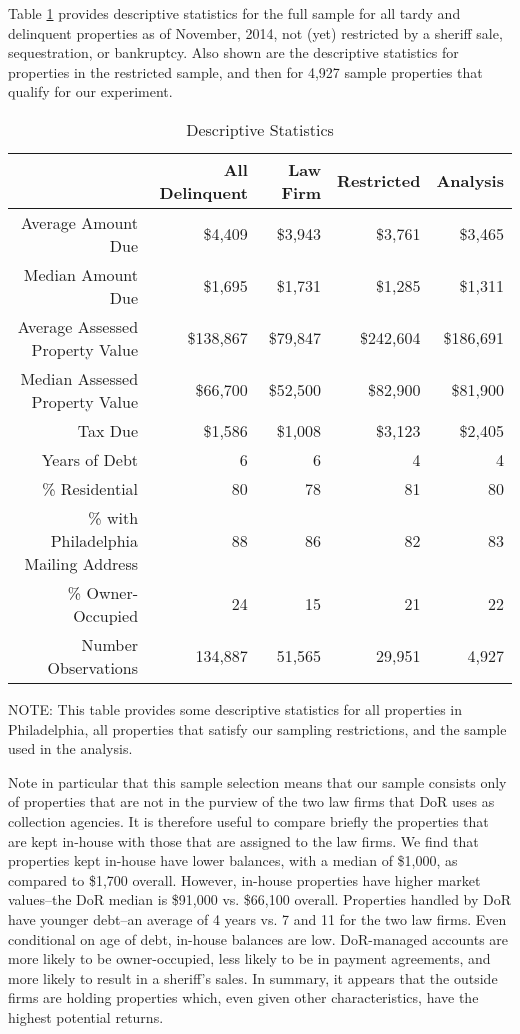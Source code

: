 \documentclass[12pt,titlepage]{article}
\begin{document}
Table \ref{table:descriptives} provides descriptive statistics for the full sample 
for all tardy and delinquent properties as of November, 2014, not (yet) 
restricted by a sheriff sale, sequestration, or bankruptcy.   Also shown 
are the descriptive statistics for properties in the restricted sample, 
and then for  4,927 sample properties that qualify for our experiment.


\begin{table}[ht]
\centering
\caption{Descriptive Statistics} 
\label{table:descriptives}
\begin{tabular}{|r|r|r|r|r|}
  \hline
 & All Delinquent & Law Firm & Restricted & Analysis \\ 
  \hline
Average Amount Due & \$4,409 & \$3,943 & \$3,761 & \$3,465 \\ 
  Median Amount Due & \$1,695 & \$1,731 & \$1,285 & \$1,311 \\ 
  Average Assessed Property Value & \$138,867 & \$79,847 & \$242,604 & \$186,691 \\ 
  Median Assessed Property Value & \$66,700 & \$52,500 & \$82,900 & \$81,900 \\ 
  Tax Due & \$1,586 & \$1,008 & \$3,123 & \$2,405 \\ 
  Years of Debt & 6 & 6 & 4 & 4 \\ 
  \% Residential & 80 & 78 & 81 & 80 \\ 
  \% with Philadelphia Mailing Address & 88 & 86 & 82 & 83 \\ 
  \% Owner-Occupied & 24 & 15 & 21 & 22 \\ 
  Number Observations & 134,887 & 51,565 & 29,951 & 4,927 \\ 
   \hline
\end{tabular}
NOTE: This table provides some descriptive statistics for all
properties in Philadelphia, all properties that satisfy our sampling
restrictions, and the sample used in the analysis.
\end{table}


Note in particular that this sample selection means that our sample
consists only of properties that are not in the purview of the two law
firms that DoR uses as collection agencies. It is therefore useful to
compare briefly the properties that are kept in-house with those that
are assigned to the law firms. We find that properties kept in-house
have lower balances, with a median of \$1,000, as compared to \$1,700
overall. However, in-house properties have higher market values--the
DoR median is \$91,000 vs. \$66,100 overall. Properties handled by DoR
have younger debt--an average of 4 years vs. 7 and 11 for the two law
firms.  Even conditional on age of debt, in-house balances are low.
DoR-managed accounts are more likely to be owner-occupied, less likely
to be in payment agreements, and more likely to result in a sheriff's
sales. In summary, it appears that the outside firms are holding
properties which, even given other characteristics, have the highest
potential returns.
\end{document}
